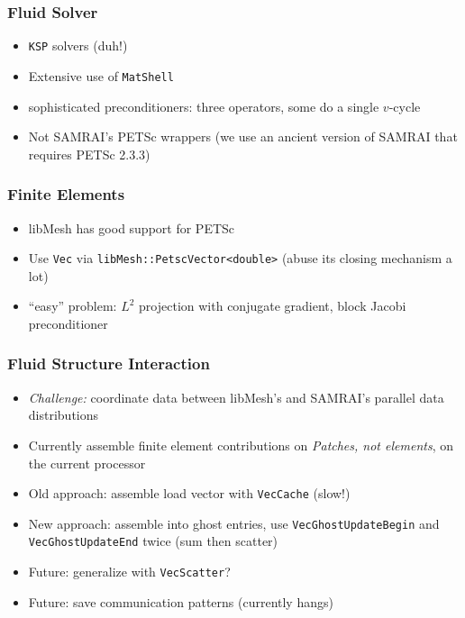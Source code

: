 \documentclass[8pt]{beamer}
\begin{document}
\begin{frame}
    \frametitle{Fluid Solver}
    \begin{itemize}
        \item \texttt{KSP} solvers (duh!)
        \item Extensive use of \texttt{MatShell}
        \item sophisticated preconditioners: three operators, some do a single
              \(v\)-cycle
        \item Not SAMRAI's PETSc wrappers (we use an ancient version of SAMRAI
              that requires PETSc 2.3.3)
    \end{itemize}
\end{frame}

\begin{frame}
    \frametitle{Finite Elements}
    \begin{itemize}
        \item libMesh has good support for PETSc
        \item Use \texttt{Vec} via \texttt{libMesh::PetscVector<double>} (abuse
              its closing mechanism a lot)
        \item ``easy'' problem: \(L^2\) projection with conjugate gradient,
              block Jacobi preconditioner
    \end{itemize}
\end{frame}

\begin{frame}
    \frametitle{Fluid Structure Interaction}
    \begin{itemize}
        \item \emph{Challenge:} coordinate data between libMesh's and SAMRAI's
              parallel data distributions
        \item Currently assemble finite element contributions on \emph{Patches,
              not elements}, on the current processor
        \item Old approach: assemble load vector with \texttt{VecCache} (slow!)
        \item New approach: assemble into ghost entries, use
              \texttt{VecGhostUpdateBegin} and \texttt{VecGhostUpdateEnd}
              twice (sum then scatter)
        \item Future: generalize with \texttt{VecScatter}?
        \item Future: save communication patterns (currently hangs)
    \end{itemize}
\end{frame}
\end{document}
